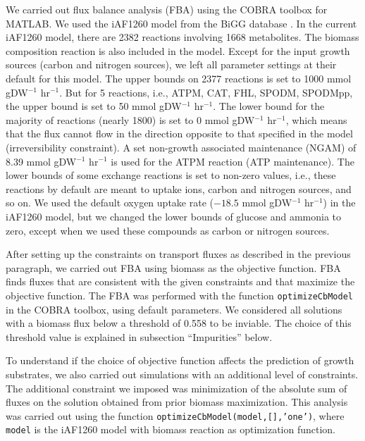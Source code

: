 \documentclass[12pt]{article}
\begin{document}
We carried out flux balance analysis (FBA) using the COBRA toolbox \cite{Schellenbergeretal2011} for MATLAB. 
We used the iAF1260 model from the BiGG database \cite{Schellenbergeretal2010}. In the current iAF1260 model, there are 2382 reactions involving 1668 metabolites. The biomass composition reaction is also included in the model. Except for the input growth sources (carbon and nitrogen sources), we left all parameter settings at their default for this model. The upper bounds on 2377 reactions is set to 1000  mmol gDW$^{-1}$ hr$^{-1}$. But for 5 reactions, i.e., ATPM, CAT, FHL, SPODM, SPODMpp, the upper bound is set to 50 mmol gDW$^{-1}$ hr$^{-1}$. The lower bound for the majority of reactions (nearly 1800) is set to 0 mmol gDW$^{-1}$ hr$^{-1}$, which means that the flux cannot flow in the direction opposite to that specified in the model (irreversibility constraint). A set non-growth associated maintenance (NGAM) of 8.39  mmol gDW$^{-1}$ hr$^{-1}$ is used for the ATPM reaction (ATP maintenance). The lower bounds of some exchange reactions is set to non-zero values, i.e., these reactions by default are meant to uptake ions, carbon and nitrogen sources, and so on. We used the default oxygen uptake rate ($-18.5$ mmol gDW$^{-1}$ hr$^{-1}$) in the iAF1260 model, but we changed the lower bounds of glucose and ammonia to zero, except when we used these compounds as carbon or nitrogen sources.

After setting up the constraints on transport fluxes as described in the previous paragraph, we carried out FBA using biomass as the objective function. FBA finds fluxes that are consistent with the given constraints and that maximize the objective function. The FBA was performed with the function \texttt{optimizeCbModel} in the COBRA toolbox, using default parameters. We considered all solutions with a biomass flux below a threshold of 0.558 to be inviable. The choice of this threshold value is explained in subsection ``Impurities'' below.

To understand if the choice of objective function affects the prediction of growth substrates, we also carried out simulations with an additional level of constraints. The additional constraint we imposed was minimization of the absolute sum of fluxes on the solution obtained from prior biomass maximization. This analysis was carried out using the function \texttt{optimizeCbModel(model,[],'one')},  where \texttt{model} is the iAF1260 model with biomass reaction as optimization function.
\end{document}
